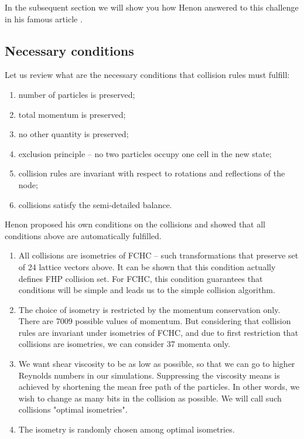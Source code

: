 In the subsequent section we will show you how Henon answered to this challenge in his famous article \cite{henon}.

\bigskip

\subsection{Necessary conditions}

Let us review what are the necessary conditions that collision rules must fulfill:

\begin{enumerate}
\item number of particles is preserved;
\item total momentum is preserved;
\item no other quantity is preserved;
\item exclusion principle -- no two particles occupy one cell in the new state;
\item collision rules are invariant with respect to rotations and reflections of the node;
\item collisions satisfy the semi-detailed balance.
\end{enumerate}

Henon proposed his own conditions on the collisions and showed that all conditions above are automatically fulfilled.

\begin{enumerate}
\item All collisions are isometries of FCHC -- such transformations that preserve set of 24 lattice vectors above. It can be shown that this condition actually defines FHP collision set. For FCHC, this condition guarantees that conditions will be simple and leads us to the simple collision algorithm.

\item The choice of isometry is restricted by the momentum conservation only.
There are 7009 possible values of momentum. But considering that collision rules are invariant under isometries of FCHC, and due to first restriction that collisions are isometries, we can consider 37 momenta only.

\item We want shear viscosity to be as low as possible, so that we can go to higher Reynolds numbers in our simulations. Suppressing the viscosity means is achieved by shortening the mean free path of the particles. In other words, we wish to change as many bits in the collision as possible. We will call such collisions "optimal isometries".

\item The isometry is randomly chosen among optimal isometries.

\end{enumerate}

